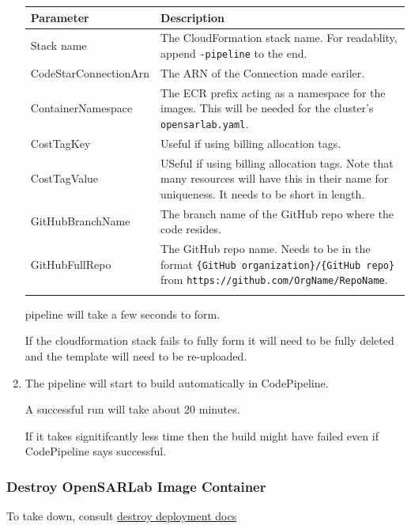 \begin{enumerate}
\bigskip\noindent
\begin{tabular}{p{}p{}}
\toprule
Parameter & Description \\
\hline
Stack name & The CloudFormation stack name. For readablity, append \texttt{-pipeline} to the end. \\
CodeStarConnectionArn & The ARN of the Connection made eariler. \\
ContainerNamespace & The ECR prefix acting as a namespace for the images. This will be needed for the cluster's \texttt{opensarlab.yaml}. \\
CostTagKey & Useful if using billing allocation tags. \\
CostTagValue & USeful if using billing allocation tags. Note that many resources will have this in their name for uniqueness. It needs to be short in length. \\
GitHubBranchName & The branch name of the GitHub repo where the code resides. \\
GitHubFullRepo & The GitHub repo name. Needs to be in the format \texttt{\{GitHub organization\}/\{GitHub repo\}} from \texttt{https://github.com/OrgName/RepoName}. \\
 &  \\
\bottomrule
\end{tabular}

\bigskipThe pipeline will take a few seconds to form.

If the cloudformation stack fails to fully form it will need to be fully deleted and the template will need to be re-uploaded.


\item The pipeline will start to build automatically in CodePipeline.

A successful run will take about 20 minutes.

If it takes signitifcantly less time then the build might have failed even if CodePipeline says successful.
\end{enumerate}

\subsubsection{Destroy OpenSARLab Image Container}

To take down, consult \href{/destroy\_deployment-6f6158ca5a80c78044e8f318e61a1a66.md}{destroy deployment docs}